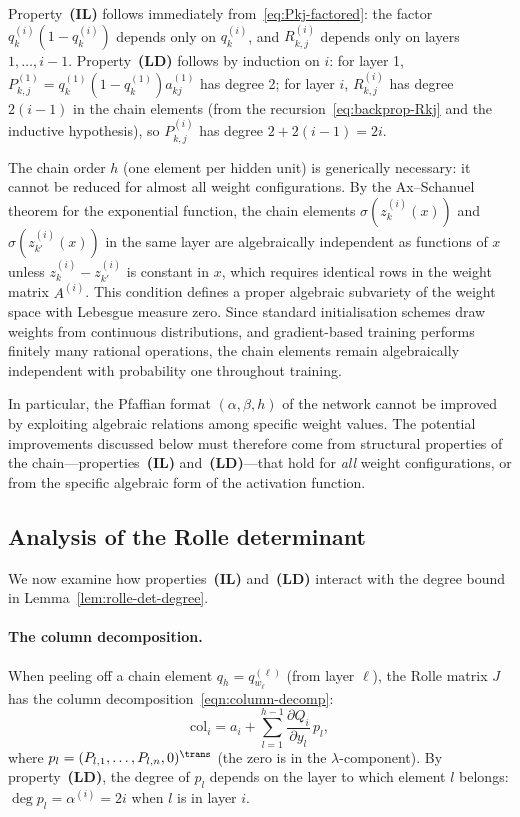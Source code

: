 Property~\textbf{(IL)} follows immediately from~\eqref{eq:Pkj-factored}: the factor $q_k^{(i)}(1-q_k^{(i)})$ depends only on $q_k^{(i)}$, and $R_{k,j}^{(i)}$ depends only on layers $1, \ldots, i-1$.
Property~\textbf{(LD)} follows by induction on $i$: for layer 1, $P_{k,j}^{(1)} = q_k^{(1)}(1-q_k^{(1)}) a_{kj}^{(1)}$ has degree 2; for layer $i$, $R_{k,j}^{(i)}$ has degree $2(i-1)$ in the chain elements (from the recursion~\eqref{eq:backprop-Rkj} and the inductive hypothesis), so $P_{k,j}^{(i)}$ has degree $2 + 2(i-1) = 2i$.

\begin{remark}\label{rem:generic-chain-order}
  The chain order $h$ (one element per hidden unit) is generically necessary: it cannot be reduced for almost all weight configurations. By the Ax--Schanuel theorem for the exponential function, the chain elements $\sigma(z_k^{(i)}(x))$ and $\sigma(z_{k'}^{(i)}(x))$ in the same layer are algebraically independent as functions of $x$ unless $z_k^{(i)} - z_{k'}^{(i)}$ is constant in $x$, which requires identical rows in the weight matrix $A^{(i)}$. This condition defines a proper algebraic subvariety of the weight space with Lebesgue measure zero. Since standard initialisation schemes draw weights from continuous distributions, and gradient-based training performs finitely many rational operations, the chain elements remain algebraically independent with probability one throughout training.

  In particular, the Pfaffian format $(\alpha, \beta, h)$ of the network cannot be improved by exploiting algebraic relations among specific weight values. The potential improvements discussed below must therefore come from structural properties of the chain---properties~\textbf{(IL)} and~\textbf{(LD)}---that hold for \emph{all} weight configurations, or from the specific algebraic form of the activation function.
\end{remark}

\subsection{Analysis of the Rolle determinant}

We now examine how properties~\textbf{(IL)} and~\textbf{(LD)} interact with the degree bound in Lemma~\ref{lem:rolle-det-degree}.

\paragraph{The column decomposition.}
When peeling off a chain element $q_h = q_{w_\ell}^{(\ell)}$ (from layer $\ell$), the Rolle matrix $J$ has the column decomposition~\eqref{eqn:column-decomp}:
\begin{equation*}
  \mathrm{col}_i = a_i + \sum_{l=1}^{h-1} \frac{\partial Q_i}{\partial y_l}\, p_l,
\end{equation*}
where $p_l = (P_{l,1}, \ldots, P_{l,n}, 0)^\trans$ (the zero is in the $\lambda$-component). By property~\textbf{(LD)}, the degree of $p_l$ depends on the layer to which element $l$ belongs: $\deg p_l = \alpha^{(i)} = 2i$ when $l$ is in layer $i$.

